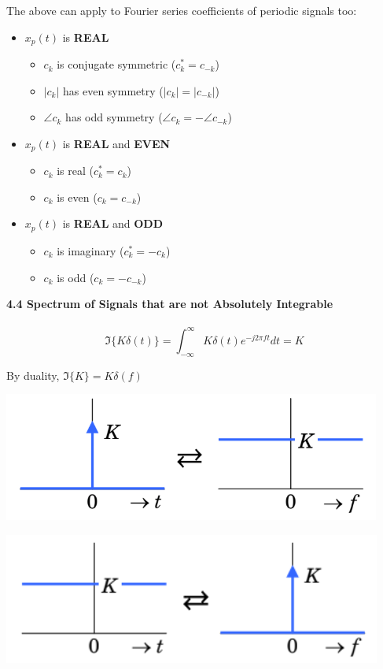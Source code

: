 \documentclass[6pt,landscape,a4paper]{extarticle}
\newenvironment{Figure}
  {\par\medskip\noindent\minipage{\linewidth}}
  {\endminipage\par\medskip}
\begin{document}
\begin{multicols*}{5}
    The above can apply to Fourier series coefficients of periodic signals too:
    \begin{itemize}
        \item $x_p(t)$ is \textbf{REAL}
        \begin{itemize}
            \item $c_k$ is conjugate symmetric \textcolor{black!70}{($c_k^* = c_{-k}$)}
            \item $|c_k|$ has even symmetry \textcolor{black!70}{($|c_k|=|c_{-k}|$)}
            \item $\angle c_k$ has odd symmetry \textcolor{black!70}{($\angle c_k = -\angle c_{-k}$)}
        \end{itemize}
        \item $x_p(t)$ is \textbf{REAL} and \textbf{EVEN}
        \begin{itemize}
            \item $c_k$ is real \textcolor{black!70}{($c_k^*=c_k$)}
            \item $c_k$ is even \textcolor{black!70}{($c_k=c_{-k}$)}
        \end{itemize}
        \item $x_p(t)$ is \textbf{REAL} and \textbf{ODD}
        \begin{itemize}
            \item $c_k$ is imaginary \textcolor{black!70}{($c_k^*=-c_k$)}
            \item $c_k$ is odd \textcolor{black!70}{($c_k=-c_{-k}$)}
        \end{itemize}
    \end{itemize}
    \textbf{4.4 Spectrum of Signals that are not Absolutely Integrable}\\\\
    \[
        \Im\{K\delta (t)\} = \int_{-\infty}^{\infty}K \delta(t)e^{-j2\pi  ft}dt=K \tag{4.13}
    \]

    By duality, $\Im\{K\}=K\delta(f)$
    \begin{Figure}
        \centering
        \includegraphics[width=0.8\linewidth]{images/fourierOfImpulse.png}
    \end{Figure}
    \begin{Figure}
        \centering
        \includegraphics[width=0.8\linewidth]{images/fourierOfConstant.png}
    \end{Figure}


\end{multicols*}
\end{document}
